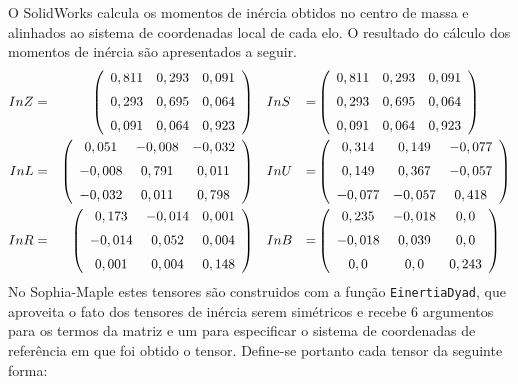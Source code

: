 O SolidWorks calcula os momentos de inércia obtidos no centro de massa e
alinhados ao sistema de coordenadas local de cada elo.
O resultado do cálculo dos momentos de inércia são apresentados a seguir.
%
\begin{align*}
InZ &=& \left( \begin {array}{ccc}  0,811& 0,293& 0,091\\ \noalign{\medskip}
 0,293& 0,695& 0,064\\ \noalign{\medskip} 0,091& 0,064& 0,923
\end {array} \right) & \quad InS &=& \left( \begin {array}{ccc}  0,811& 0,293& 0,091\\ \noalign{\medskip}
 0,293& 0,695& 0,064\\ \noalign{\medskip} 0,091& 0,064& 0,923
\end {array} \right) \\
InL &=&  \left( \begin {array}{ccc}  0,051&-
0,008&- 0,032 \\ \noalign{\medskip}- 0,008& 0,791& 0,011\\ \noalign{\medskip}- 0,032
& 0,011& 0,798\end {array} \right) & \quad InU &=& \left( \begin {array}{ccc} 
0,314& 0,149&- 0,077\\ \noalign{\medskip} 0,149& 0,367&- 0,057\\ \noalign{\medskip}- 0,077&- 0,057& 0,418
\end {array} \right) \\
InR &=&  \left( \begin {array}{ccc}  0,173&-
0,014& 0,001\\ \noalign{\medskip} - 0,014& 0,052& 0,004\\ \noalign{\medskip} 0,001& 0,004& 0,148
\end {array} \right) & \quad InB &=&  \left( \begin {array}{ccc}  0,235&- 0,018& 0,0\\ \noalign{\medskip}-
 0,018& 0,039& 0,0\\ \noalign{\medskip} 0,0& 0,0& 0,243\end {array}
 \right)
\end{align*}
%
No Sophia-Maple estes tensores são construidos com a função
\texttt{EinertiaDyad}, que aproveita o fato dos tensores de inércia serem
simétricos e recebe 6 argumentos para os termos da matriz e um para especificar
o sistema de coordenadas de referência em que foi obtido o tensor. Define-se
portanto cada tensor da seguinte forma:


